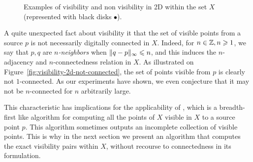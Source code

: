     
    \begin{figure}[t]
      \centering
      
      \caption{Examples of visibility and non visibility in 2D within
        the set $X$ (represented with black disks $\bullet$).}
      \label{fig:visibility-2d}
    \end{figure}


    A quite unexpected fact about visibility it that the set of
    visible points from a source $p$ is not necessarily digitally
    connected in $X$. Indeed, for $n \in \mathbb{Z}, n \geqslant 1$, we say that
    $p,q$ are \emph{$n$-neighbors} when $\|q-p\|_\infty \leqslant n$, and
    this induces the $n$-adjacency and $n$-connectedness relation in
    $X$. As illustrated on
    Figure~\ref{fig:visibility-2d-not-connected}, the set of points
    visible from $p$ is clearly not $1$-connected. As our experiments
    have shown, we even conjecture that it may not be $n$-connected
    for $n$ arbitrarily large.

    This characteristic has implications for the applicability of
    \cite[Algorithm 3]{lachaud:2022-jmiv}, which is a breadth-first
    like algorithm for computing all the points of $X$ visible in $X$
    to a source point $p$. This algorithm sometimes outputs an
    incomplete collection of visible points. This is why in the next
    section we present an algorithm that computes the exact visibility
    pairs within $X$, without recourse to connectedness in its formulation.



